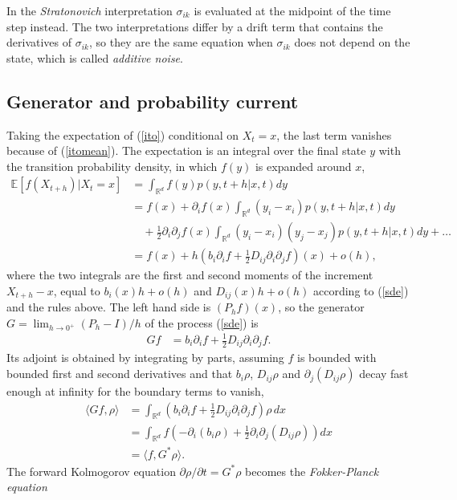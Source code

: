 \documentclass[11pt]{article}
\begin{document}
In the {\it Stratonovich} interpretation $\sigma_{ik}$ is evaluated at the midpoint of the time step instead. The two interpretations differ by a drift term that contains the derivatives of $\sigma_{ik}$, so they are the same equation when $\sigma_{ik}$ does not depend on the state, which is called {\it additive noise}.

\subsection{Generator and probability current}
Taking the expectation of (\ref{ito}) conditional on $X_t=x$, the last term vanishes because of (\ref{itomean}). The expectation is an integral over the final state $y$ with the transition probability density, in which $f(y)$ is expanded around $x$,
\begin{align}
  \mathbb{E}[f(X_{t+h})|X_t=x]&=\int_{\mathbb{R}^d}f(y)p(y,t+h|x,t)dy\nonumber\\
  &=f(x)+\partial_if(x)\int_{\mathbb{R}^d}(y_i-x_i)p(y,t+h|x,t)dy\nonumber\\
  &\quad+\frac{1}{2}\partial_i\partial_jf(x)\int_{\mathbb{R}^d}(y_i-x_i)(y_j-x_j)p(y,t+h|x,t)dy+\dots\nonumber\\
  &=f(x)+h\left(b_i\partial_if+\frac{1}{2}D_{ij}\partial_i\partial_jf\right)(x)+o(h),
\end{align}
where the two integrals are the first and second moments of the increment $X_{t+h}-x$, equal to $b_i(x)h+o(h)$ and $D_{ij}(x)h+o(h)$ according to (\ref{sde}) and the rules above.
The left hand side is $(P_hf)(x)$, so the generator $G=\lim_{h\rightarrow 0^+}(P_h-I)/h$ of the process (\ref{sde}) is
\begin{align}
  Gf&=b_i\partial_if+\frac{1}{2}D_{ij}\partial_i\partial_jf.
\end{align}
Its adjoint is obtained by integrating by parts, assuming $f$ is bounded with bounded first and second derivatives and that $b_i\rho$, $D_{ij}\rho$ and $\partial_j(D_{ij}\rho)$ decay fast enough at infinity for the boundary terms to vanish,
\begin{align}
  \langle Gf,\rho\rangle&=\int_{\mathbb{R}^d}\left(b_i\partial_if+\frac{1}{2}D_{ij}\partial_i\partial_jf\right)\rho\,dx\nonumber\\
  &=\int_{\mathbb{R}^d}f\left(-\partial_i(b_i\rho)+\frac{1}{2}\partial_i\partial_j(D_{ij}\rho)\right)dx\nonumber\\
  &=\langle f,G^*\rho\rangle.
\end{align}
The forward Kolmogorov equation $\partial\rho/\partial t=G^*\rho$ becomes the {\it Fokker-Planck equation}
\end{document}
